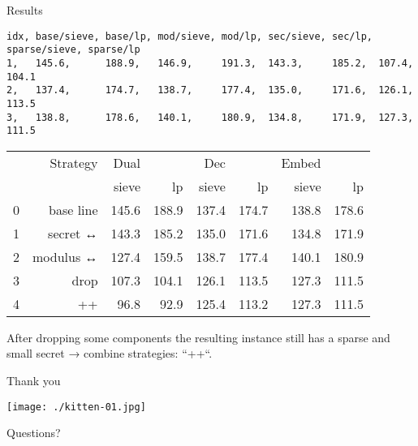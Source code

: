 \documentclass[presentation,smaller]{beamer}
\begin{document}
\begin{frame}[fragile,label={sec:org9ac5fd8}]{Results}
 \lstset{language=csv,label= ,caption= ,captionpos=b,numbers=none}
\begin{lstlisting}
idx, base/sieve, base/lp, mod/sieve, mod/lp, sec/sieve, sec/lp, sparse/sieve, sparse/lp
1,   145.6,      188.9,   146.9,     191.3,  143.3,     185.2,  107.4,        104.1
2,   137.4,      174.7,   138.7,     177.4,  135.0,     171.6,  126.1,        113.5
3,   138.8,      178.6,   140.1,     180.9,  134.8,     171.9,  127.3,        111.5
\end{lstlisting}


\begin{center}
\begin{tabular}{rr|rrrrrr}
 & Strategy & Dual &  & Dec &  & Embed & \\
 &  & sieve & lp & sieve & lp & sieve & lp\\
\hline
0 & base line & 145.6 & 188.9 & 137.4 & 174.7 & 138.8 & 178.6\\
1 & secret ↔ & 143.3 & 185.2 & 135.0 & 171.6 & 134.8 & 171.9\\
2 & modulus ↔ & 127.4 & 159.5 & 138.7 & 177.4 & 140.1 & 180.9\\
3 & drop & 107.3 & 104.1 & 126.1 & 113.5 & 127.3 & 111.5\\
\hline
4 & ++ & 96.8 & 92.9 & 125.4 & 113.2 & 127.3 & 111.5\\
\end{tabular}

\end{center}


After dropping some components the resulting instance still has a sparse and small secret → combine strategies: “++“.
\end{frame}

\begin{frame}[label={sec:orgf2d9c95}]{Thank you}
\begin{center}
\begin{center}
\texttt{[image: ./kitten-01.jpg]}
\end{center}

\alert{\Large Questions?}
\end{center}
\end{frame}
\end{document}
